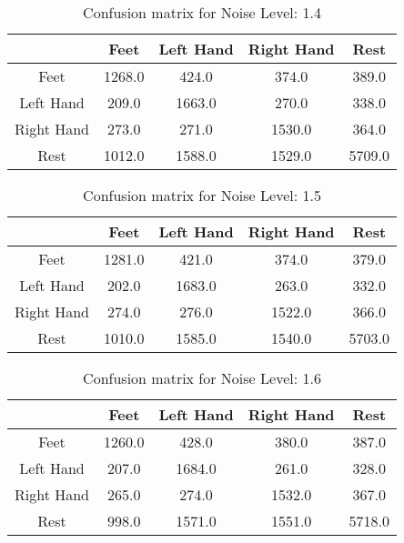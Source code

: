 \begin{table}[!htbp]
    \centering
    \begin{tabular}{|c||c|c|c|c|}
        \hline
		 & Feet & Left Hand & Right Hand & Rest \\
        \hline
        \hline
        Feet & 1268.0 & 424.0 & 374.0 & 389.0 \\
        \hline
        Left Hand & 209.0 & 1663.0 & 270.0 & 338.0 \\
        \hline
        Right Hand & 273.0 & 271.0 & 1530.0 & 364.0 \\
        \hline
        Rest & 1012.0 & 1588.0 & 1529.0 & 5709.0 \\
        \hline
    \end{tabular}
    \caption{Confusion matrix for Noise Level: 1.4}
\end{table}

\begin{table}[!htbp]
    \centering
    \begin{tabular}{|c||c|c|c|c|}
        \hline
		 & Feet & Left Hand & Right Hand & Rest \\
        \hline
        \hline
        Feet & 1281.0 & 421.0 & 374.0 & 379.0 \\
        \hline
        Left Hand & 202.0 & 1683.0 & 263.0 & 332.0 \\
        \hline
        Right Hand & 274.0 & 276.0 & 1522.0 & 366.0 \\
        \hline
        Rest & 1010.0 & 1585.0 & 1540.0 & 5703.0 \\
        \hline
    \end{tabular}
    \caption{Confusion matrix for Noise Level: 1.5}
\end{table}

\begin{table}[!htbp]
    \centering
    \begin{tabular}{|c||c|c|c|c|}
        \hline
		 & Feet & Left Hand & Right Hand & Rest \\
        \hline
        \hline
        Feet & 1260.0 & 428.0 & 380.0 & 387.0 \\
        \hline
        Left Hand & 207.0 & 1684.0 & 261.0 & 328.0 \\
        \hline
        Right Hand & 265.0 & 274.0 & 1532.0 & 367.0 \\
        \hline
        Rest & 998.0 & 1571.0 & 1551.0 & 5718.0 \\
        \hline
    \end{tabular}
    \caption{Confusion matrix for Noise Level: 1.6}
\end{table}

